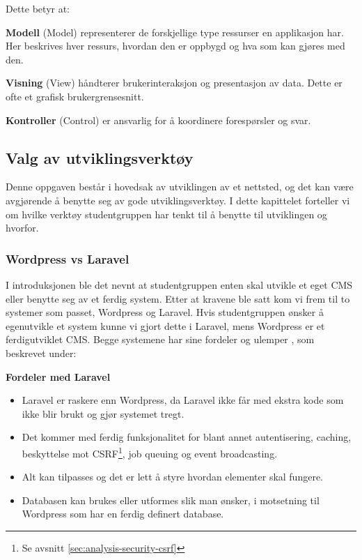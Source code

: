 Dette betyr at:

\textbf{Modell} (Model) representerer de forskjellige type ressurser en applikasjon har. Her beskrives hver ressurs, hvordan den er oppbygd og hva som kan gjøres med den.

\textbf{Visning} (View) håndterer brukerinteraksjon og presentasjon av data. Dette er ofte et grafisk brukergrensesnitt.

\textbf{Kontroller} (Control) er ansvarlig for å koordinere forespørsler og svar.

\subsection{Valg av utviklingsverktøy}
Denne oppgaven består i hovedsak av utviklingen av et nettsted, og det kan være avgjørende å benytte seg av gode utviklingsverktøy. I dette kapittelet forteller vi om hvilke verktøy studentgruppen har tenkt til å benytte til utviklingen og hvorfor.

\subsubsection{Wordpress vs Laravel}
\label{sec:wordpressvslaravel}
I introduksjonen ble det nevnt at studentgruppen enten skal utvikle et eget CMS eller benytte seg av et ferdig system. Etter at kravene ble satt kom vi frem til to systemer som passet, Wordpress og Laravel. Hvis studentgruppen ønsker å egenutvikle et system kunne vi gjort dette i Laravel, mens Wordpress er et ferdigutviklet CMS. Begge systemene har sine fordeler og ulemper \cite{cbcp2019lvw}, som beskrevet under:

\textbf{Fordeler med Laravel}
\begin{itemize}
    \item Laravel er raskere enn Wordpress, da Laravel ikke får med ekstra kode som ikke blir brukt og gjør systemet tregt.
    \item Det kommer med ferdig funksjonalitet for blant annet autentisering, caching, beskyttelse mot CSRF\footnote{Se avsnitt \ref{sec:analysis-security-csrf}}, job queuing og event broadcasting.
    \item Alt kan tilpasses og det er lett å styre hvordan elementer skal fungere.
    \item Databasen kan brukes eller utformes slik man ønsker, i motsetning til Wordpress som har en ferdig definert database.
\end{itemize}

